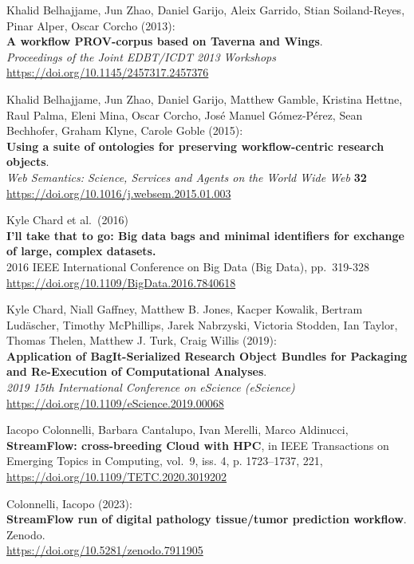 \documentclass[10pt,letterpaper]{article}
\begin{document}
\begin{thebibliography}{10}
 Khalid Belhajjame, Jun Zhao, Daniel Garijo, Aleix
Garrido, Stian Soiland-Reyes, Pinar Alper, Oscar Corcho (2013):\\
\textbf{A workflow PROV-corpus based on Taverna and Wings}.\\
\emph{Proceedings of the Joint EDBT/ICDT 2013 Workshops\\
}\url{https://doi.org/10.1145/2457317.2457376}

 Khalid Belhajjame, Jun Zhao, Daniel Garijo,
Matthew Gamble, Kristina Hettne, Raul Palma, Eleni Mina, Oscar Corcho,
José Manuel Gómez-Pérez, Sean Bechhofer, Graham Klyne, Carole Goble
(2015):\\
\textbf{Using a suite of ontologies for preserving workflow-centric
research objects}.\\
\emph{Web Semantics: Science, Services and Agents on the World Wide Web}
\textbf{32\\
}\url{https://doi.org/10.1016/j.websem.2015.01.003}

 Kyle Chard et al.~(2016)\\
\textbf{I'll take that to go: Big data bags and minimal identifiers for
exchange of large, complex datasets.}\\
2016 IEEE International Conference on Big Data (Big Data), pp.~319-328\\
\url{https://doi.org/10.1109/BigData.2016.7840618}

 Kyle Chard, Niall Gaffney, Matthew B. Jones, Kacper
Kowalik, Bertram Ludäscher, Timothy McPhillips, Jarek Nabrzyski,
Victoria Stodden, Ian Taylor, Thomas Thelen, Matthew J. Turk, Craig
Willis (2019):\\
\textbf{Application of BagIt-Serialized Research Object Bundles for
Packaging and Re-Execution of Computational Analyses}.\\
\emph{2019 15th International Conference on eScience (eScience)\\
}\url{https://doi.org/10.1109/eScience.2019.00068}

 Iacopo Colonnelli, Barbara Cantalupo, Ivan
Merelli, Marco Aldinucci, \textbf{StreamFlow: cross-breeding Cloud with
HPC}, in IEEE Transactions on Emerging Topics in Computing, vol.~9, iss.
4, p. 1723--1737, 221,
\url{https://doi.org/10.1109/TETC.2020.3019202}

 Colonnelli, Iacopo (2023):\\
\textbf{StreamFlow run of digital pathology tissue/tumor prediction
workflow}.\\
Zenodo.\\
\url{https://doi.org/10.5281/zenodo.7911905}


\end{thebibliography}
\end{document}
